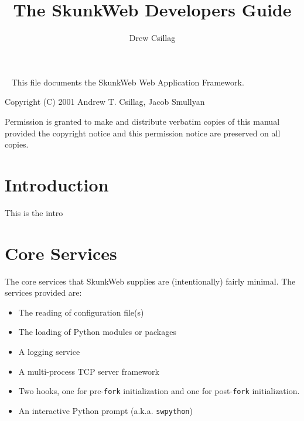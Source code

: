 \documentclass{manual}
\title{The SkunkWeb Developers Guide}
\author{Drew Csillag}
\begin{document}
\newcommand{\Location}{\texttt{Location}}
\newcommand{\PAR}{\texttt{par}}
\newcommand{\mskunkroot}[1]{\textit{SkunkRoot}\texttt{#1}}
\newcommand{\swpython}{\texttt{swpython}}
\newcommand{\connection}{\texttt{Connection}}
\newcommand{\NOTE}[1]{\textbf{\Large #1}}
\newcommand{\None}{\texttt{None}}
\newcommand{\nolocation}{[N]}


\newcommand{\argdescitem}[1]{\hspace\labelsep
                                \normalfont\ttfamily #1\ }
\newenvironment{argdesc}{\begin{list}{}{
        \renewcommand{\makelabel}{\argdescitem}
}
}{\end{list}}

\maketitle
\ 
\vfill 
\noindent
This file documents the SkunkWeb Web Application Framework.

\noindent
Copyright (C) 2001 Andrew T. Csillag, Jacob Smullyan

\noindent
Permission is granted to make and distribute verbatim copies of
this manual provided the copyright notice and this permission notice
are preserved on all copies.


\tableofcontents

\chapter{Introduction}
This is the intro


\chapter{Core Services}
The core services that SkunkWeb supplies are (intentionally) fairly minimal. 
The services provided are:
\begin{itemize}
\item The reading of configuration file(s)
\item The loading of Python modules or packages
\item A logging service
\item A multi-process TCP server framework
\item Two hooks, one for pre-\texttt{fork} initialization and one for
post-\texttt{fork} initialization.
\item An interactive Python prompt (a.k.a. \texttt{swpython})
\end{itemize}
\end{document}
